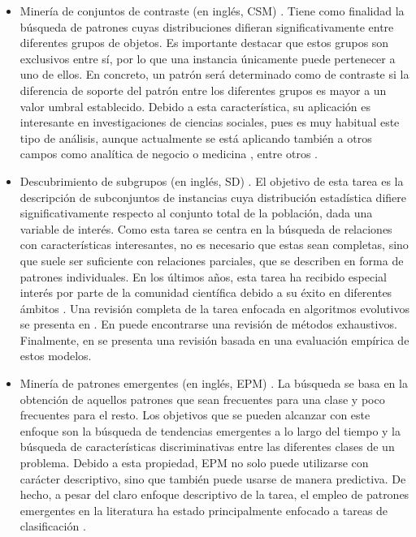 \documentclass[c5paper,10pt,twoside]{book}	   	%
\begin{document}
\begin{itemize} \label{it:sdrd_tasks}
	
	\item Minería de conjuntos de contraste (en inglés, \ac{CSM}) \cite{Bp01}. Tiene como finalidad la búsqueda de patrones cuyas distribuciones difieran significativamente entre diferentes grupos de objetos. Es importante destacar que estos grupos son exclusivos entre sí, por lo que una instancia únicamente puede pertenecer a uno de ellos. En concreto, un patrón será determinado como de contraste si la diferencia de soporte del patrón entre los diferentes grupos es mayor a un valor umbral establecido. Debido a esta característica, su aplicación es interesante en investigaciones de ciencias sociales, pues es muy habitual este tipo de análisis, aunque actualmente se está aplicando también a otros campos como analítica de negocio \cite{Ts09} o medicina \cite{Rgza15}, entre otros \cite{Boe11}.
	
	\item Descubrimiento de subgrupos (en inglés, \ac{SD}) \cite{Klo96, Wro97}. El objetivo de esta tarea es la descripción de subconjuntos de instancias cuya distribución estadística difiere significativamente respecto al conjunto total de la población, dada una variable de interés. Como esta tarea se centra en la búsqueda de relaciones con características interesantes, no es necesario que estas sean completas, sino que suele ser suficiente con relaciones parciales, que se describen en forma de patrones individuales. En los últimos años, esta tarea ha recibido especial interés por parte de la comunidad científica debido a su éxito en diferentes ámbitos \cite{Hcgd11}. Una revisión completa de la tarea enfocada en algoritmos evolutivos se presenta en \cite{Cgdh14}. En \cite{Atz15} puede encontrarse una revisión de métodos exhaustivos. Finalmente, en \cite{Hel16} se presenta una revisión basada en una evaluación empírica de estos modelos.
	

	
	\item Minería de patrones emergentes (en inglés, \ac{EPM}) \cite{Dl99,Dl05}. La búsqueda se basa en la obtención de aquellos patrones que sean frecuentes para una clase y poco frecuentes para el resto. Los objetivos que se pueden alcanzar con este enfoque son la búsqueda de tendencias emergentes a lo largo del tiempo y la búsqueda de características discriminativas entre las diferentes clases de un problema. Debido a esta propiedad, \ac{EPM} no solo puede utilizarse con carácter descriptivo, sino que también puede usarse de manera predictiva. De hecho, a pesar del claro enfoque descriptivo de la tarea, el empleo de patrones emergentes en la literatura ha estado principalmente enfocado a tareas de clasificación \cite{Gmc14}.
\end{itemize} 
\end{document}
